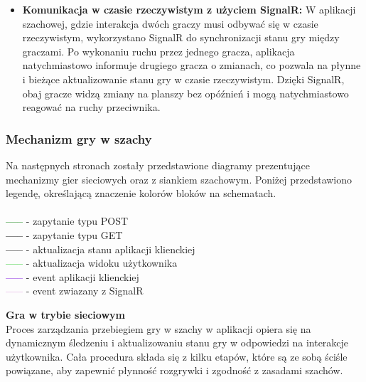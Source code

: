 \documentclass[12pt,a4paper]{article}
\begin{document}
\begin{itemize}
    \item \textbf{Komunikacja w czasie rzeczywistym z użyciem SignalR:}
    W aplikacji szachowej, gdzie interakcja dwóch graczy musi odbywać się w czasie rzeczywistym, wykorzystano SignalR do synchronizacji stanu gry między graczami. Po wykonaniu ruchu przez jednego gracza, aplikacja natychmiastowo informuje drugiego gracza o zmianach, co pozwala na płynne i bieżące aktualizowanie stanu gry w czasie rzeczywistym. Dzięki SignalR, obaj gracze widzą zmiany na planszy bez opóźnień i mogą natychmiastowo reagować na ruchy przeciwnika.

\end{itemize}

\newpage

\subsubsection{Mechanizm gry w szachy}
Na następnych stronach zostały przedstawione diagramy prezentujące mechanizmy gier sieciowych oraz z siankiem szachowym. Poniżej przedstawiono legendę, określającą znaczenie kolorów bloków na schematach.
\\\\
\textbf{\colorbox{ForestGreen!90}{\textcolor{ForestGreen}{-----}}} - zapytanie typu POST\\
\textbf{\colorbox{Cerulean!90}{\textcolor{Cerulean}{-----}}} - zapytanie typu GET\\
\textbf{\colorbox{Dandelion!90}{\textcolor{Dandelion}{-----}}} - aktualizacja stanu aplikacji klienckiej\\
\textbf{\colorbox{LimeGreen!90}{\textcolor{LimeGreen}{-----}}} - aktualizacja widoku użytkownika\\
\textbf{\colorbox{BlueViolet!90}{\textcolor{BlueViolet}{-----}}} - event aplikacji klienckiej\\
\textbf{\colorbox{Plum!90}{\textcolor{Plum}{-----}}} - event zwiazany z SignalR\\
\vspace{0.5cm}

\noindent \textbf{Gra w trybie sieciowym}\\
Proces zarządzania przebiegiem gry w szachy w aplikacji opiera się na dynamicznym śledzeniu i aktualizowaniu stanu gry w odpowiedzi na interakcje użytkownika. Cała procedura składa się z kilku etapów, które są ze sobą ściśle powiązane, aby zapewnić płynność rozgrywki i zgodność z zasadami szachów.
\end{document}
